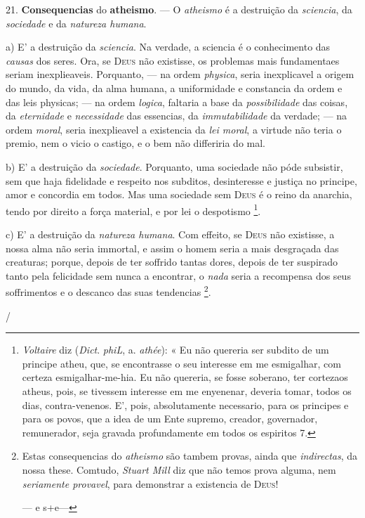 21. \textbf{Consequencias} do \textbf{atheismo}. --- O \emph{atheismo} é a destruição da \emph{sciencia}, da \emph{sociedade} e da \emph{natureza humana}.

 a) E' a destruição da \emph{sciencia}. Na verdade, a sciencia é o conhecimento das \emph{causas} dos seres. Ora, se \textsc{Deus} não existisse, os problemas mais fundamentaes seriam inexplieaveis. Porquanto, --- na ordem \emph{physica}, seria inexplicavel a origem do mundo, da vida, da alma humana, a uniformidade e constancia da ordem e das leis physicas; --- na ordem \emph{logica}, faltaria a base da \emph{possibilidade} das coisas, da \emph{eternidade} e \emph{necessidade} das essencias, da \emph{immutabilidade} da verdade; --- na ordem \emph{moral}, seria inexplieavel a existencia da \emph{lei moral}, a virtude não teria o premio, nem o vicio o castigo, e o bem não differiria do mal.

b) E' a destruição da \emph{sociedade}. Porquanto, uma sociedade não póde subsistir, sem que haja fidelidade e respeito nos subditos, desinteresse e justiça no principe, amor e concordia em todos. Mas uma sociedade sem \textsc{Deus} é o reino da anarchia, tendo por direito a força material, e por lei o despotismo \footnote{\emph{Voltaire} diz (\emph{Dict}. \emph{phiL}, a. \emph{athée}): « Eu não quereria ser subdito de um principe atheu, que, se encontrasse o seu interesse em me esmigalhar, com certeza esmigalhar-me-hia. Eu não quereria, se fosse soberano, ter cortezaos atheus, pois, se tivessem interesse em me enyenenar, deveria tomar, todos os dias, contra-venenos. E', pois, absolutamente necessario, para os principes e para os povos, que a idea de um Ente supremo, creador, governador, remunerador, seja gravada profundamente em todos os espiritos 7.}.

c) E' a destruição da \emph{natureza humana}. Com effeito, se \textsc{Deus} não existisse, a nossa alma não seria immortal, e assim o homem seria a mais desgraçada das creaturas; porque, depois de ter soffrido tantas dores, depois de ter suspirado tanto pela felicidade sem nunca a encontrar, o \emph{nada} seria a recompensa dos seus soffrimentos e o descanco das suas tendencias \footnote{Estas consequencias do \emph{atheismo} são tambem provas, ainda que \emph{indirectas}, da nossa these. Comtudo, \emph{Stuart Mill} diz que não temos prova alguma, nem \emph{seriamente provavel}, para demonstrar a existencia de \textsc{Deus}!\par --- e s+e---}.

/
